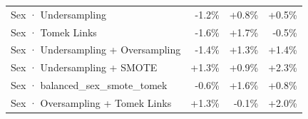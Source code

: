 \begin{table}[htbp]
\begin{tabular}{lrrr}
Sex · Undersampling & \textcolor{BrickRed}{-1.2\%} & \textcolor{OliveGreen}{+0.8\%} & \textcolor{OliveGreen}{+0.5\%} \\
Sex · Tomek Links & \textcolor{BrickRed}{-1.6\%} & \textcolor{OliveGreen}{+1.7\%} & \textcolor{BrickRed}{-0.5\%} \\
Sex · Undersampling + Oversampling & \textcolor{BrickRed}{-1.4\%} & \textcolor{OliveGreen}{+1.3\%} & \textcolor{OliveGreen}{+1.4\%} \\
Sex · Undersampling + SMOTE & \textcolor{OliveGreen}{+1.3\%} & \textcolor{OliveGreen}{+0.9\%} & \textcolor{OliveGreen}{+2.3\%} \\
Sex · balanced_sex_smote_tomek & \textcolor{BrickRed}{-0.6\%} & \textcolor{OliveGreen}{+1.6\%} & \textcolor{OliveGreen}{+0.8\%} \\
Sex · Oversampling + Tomek Links & \textcolor{OliveGreen}{+1.3\%} & \textcolor{BrickRed}{-0.1\%} & \textcolor{OliveGreen}{+2.0\%} \\
\bottomrule
\end{tabular}
\end{table}
